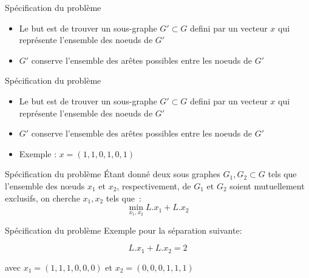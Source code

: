 \begin{frame}{Spécification du problème}
    \begin{minipage}{0.49\linewidth}
        \begin{itemize}
            \item Le but est de trouver un sous-graphe $G'\subset G$ defini par un vecteur $x$ qui représente l'ensemble des noeuds de $G'$
            \item $G'$ conserve l'ensemble des arêtes possibles entre les noeuds de $G'$
        \end{itemize}
    \end{minipage}
    \begin{minipage}{0.49\linewidth}
    \end{minipage}
\end{frame}
\begin{frame}{Spécification du problème}
    \begin{minipage}{0.49\linewidth}
        \begin{itemize}
            \item Le but est de trouver un sous-graphe $G'\subset G$ defini par un vecteur $x$ qui représente l'ensemble des noeuds de $G'$
            \item $G'$ conserve l'ensemble des arêtes possibles entre les noeuds de $G'$
            \item Exemple : $x =(1,1,0,1,0,1)$
        \end{itemize}
    \end{minipage}
    \begin{minipage}{0.49\linewidth}
    \end{minipage}
\end{frame}

\begin{frame}{Spécification du problème}
    Étant donné deux sous graphes $G_1,G_2 \subset G$ tels que l'ensemble des nœuds $x_1$ et $x_2$, respectivement, de $G_1$ et $G_2$ soient mutuellement exclusifs, on cherche $x_1, x_2$ tels que~:
    $$
        \min_{x_1, x_2} L.x_1 + L.x_2
    $$
\end{frame}

\begin{frame}{Spécification du problème}
    Exemple pour la séparation suivante:


    $$
        L.x_1 + L.x_2 = 2
    $$

    avec $x_1 = (1,1,1,0,0,0)$ et $x_2 = (0,0,0,1,1,1)$
\end{frame}

